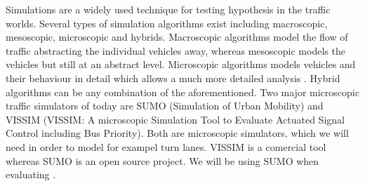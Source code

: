 Simulations are a widely used technique for testing hypothesis in the traffic worlds.
Several types of simulation algorithms exist including macroscopic, mesoscopic, microscopic and hybrids.
Macroscopic algorithms model the flow of traffic abstracting the individual vehicles away, whereas mesoscopic models the vehicles but still at an abstract level. 
Microscopic algorithms models vehicles and their behaviour in detail which allows a much more detailed analysis \cite{meso-micro}. 
Hybrid algorithms can be any combination of the aforementioned.
Two major microscopic traffic simulators of today are SUMO (Simulation of Urban Mobility)\cite{sumo} and VISSIM (VISSIM: A microscopic Simulation Tool to Evaluate Actuated Signal Control including Bus Priority)\cite{vissim}.
Both are microscopic simulators, which we will need in order to model for exampel turn lanes.
VISSIM is a comercial tool whereas SUMO is an open source project.
We will be using SUMO when evaluating \tech.








